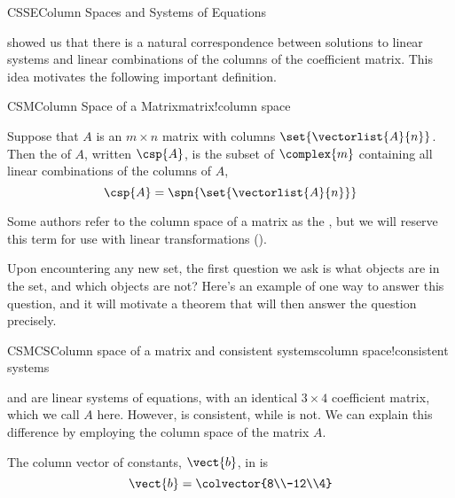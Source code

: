 \begin{subsect}{CSSE}{Column Spaces and Systems of Equations}
%
\begin{para} showed us that there is a natural correspondence between solutions to linear systems and linear combinations of the columns of the coefficient matrix.  This idea motivates the following important definition.\end{para}
%
\begin{definition}{CSM}{Column Space of a Matrix}{matrix!column space}
\begin{para}Suppose that $A$ is an $m\times n$ matrix with columns $\set{\vectorlist{A}{n}}$.  Then the  of $A$, written $\csp{A}$, is the subset of $\complex{m}$ containing all linear combinations of the columns of $A$,
%
\begin{equation*}
\csp{A}=\spn{\set{\vectorlist{A}{n}}}
\end{equation*}\end{para}
%
\end{definition}
%
\begin{para}Some authors refer to the column space of a matrix as the , but we will reserve this term for use with linear transformations ().\end{para}
%
\begin{para}Upon encountering any new set, the first question we ask is what objects are in the set, and which objects are not?  Here's an example of one way to answer this question, and it will motivate a theorem that will then answer the question precisely.\end{para}
%
\begin{example}{CSMCS}{Column space of a matrix and consistent systems}{column space!consistent systems}
\begin{para} and  are linear systems of equations, with an identical $3\times 4$ coefficient matrix, which we call $A$ here.  However,  is consistent, while  is not.  We can explain this difference by employing the column space of the matrix $A$.\end{para}
%
\begin{para}The column vector of constants, $\vect{b}$, in  is
%
\begin{equation*}
\vect{b}=\colvector{8\\-12\\4}

\end{equation*}
\end{para}
\end{example}
\end{subsect}
